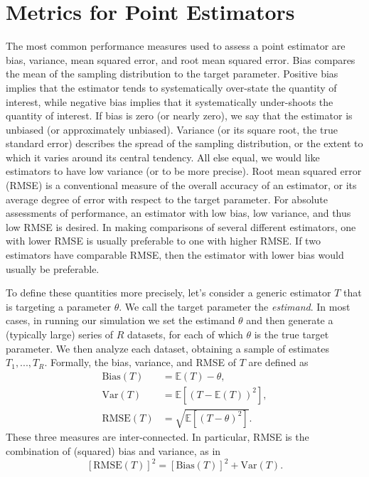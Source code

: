 \documentclass[
]{book}
\newcommand{\E}{\mathbb{E}}
\newcommand{\Var}{\text{Var}}
\newcommand{\Bias}{\text{Bias}}
\newcommand{\RMSE}{\text{RMSE}}
\begin{document}
\section{Metrics for Point Estimators}\label{assessing-point-estimators}

The most common performance measures used to assess a point estimator are bias, variance, mean squared error, and root mean squared error.
Bias compares the mean of the sampling distribution to the target parameter.
Positive bias implies that the estimator tends to systematically over-state the quantity of interest, while negative bias implies that it systematically under-shoots the quantity of interest.
If bias is zero (or nearly zero), we say that the estimator is unbiased (or approximately unbiased).
Variance (or its square root, the true standard error) describes the spread of the sampling distribution, or the extent to which it varies around its central tendency.
All else equal, we would like estimators to have low variance (or to be more precise).
Root mean squared error (RMSE) is a conventional measure of the overall accuracy of an estimator, or its average degree of error with respect to the target parameter.
For absolute assessments of performance, an estimator with low bias, low variance, and thus low RMSE is desired.
In making comparisons of several different estimators, one with lower RMSE is usually preferable to one with higher RMSE.
If two estimators have comparable RMSE, then the estimator with lower bias would usually be preferable.

To define these quantities more precisely, let's consider a generic estimator \(T\) that is targeting a parameter \(\theta\).
We call the target parameter the \emph{estimand}.
In most cases, in running our simulation we set the estimand \(\theta\) and then generate a (typically large) series of \(R\) datasets, for each of which \(\theta\) is the true target parameter.
We then analyze each dataset, obtaining a sample of estimates \(T_1,...,T_R\).
Formally, the bias, variance, and RMSE of \(T\) are defined as
\[
\begin{aligned}
\Bias(T) &= \E(T) - \theta, \\ 
\Var(T) &= \E\left[\left(T - \E (T)\right)^2 \right], \\
\RMSE(T) &= \sqrt{\E\left[\left(T - \theta\right)^2 \right]}.
\end{aligned}
\label{eq:bias-variance-RMSE}
\]
These three measures are inter-connected.
In particular, RMSE is the combination of (squared) bias and variance, as in
\[ 
\left[\RMSE(T)\right]^2 = \left[\Bias(T)\right]^2 + \Var(T). 
\label{eq:RMSE-decomposition}
\]
\end{document}
